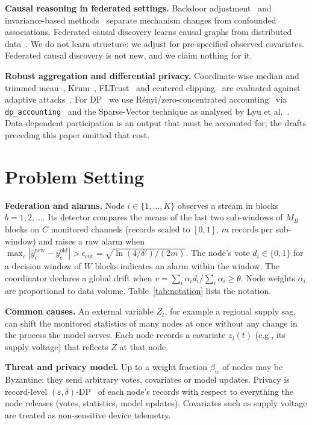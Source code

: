 \IfFileExists{IEEEtran.cls}{\documentclass[journal]{IEEEtran}\newcommand{\ieeemode}{}}{\documentclass[10pt,twocolumn,letterpaper]{article}\usepackage[margin=0.72in,columnsep=0.22in]{geometry}}
\begin{document}
\noindent\textbf{Causal reasoning in federated settings.} Backdoor adjustment~\cite{pearl2009causality} and invariance-based methods~\cite{peters2016icp} separate mechanism changes from confounded associations. Federated causal discovery learns causal graphs from distributed data~\cite{ng2022federatedbn,gao2023feddag,li2024fcd}. We do not learn structure: we adjust for pre-specified observed covariates. Federated causal discovery is not new, and we claim nothing for it.

\noindent\textbf{Robust aggregation and differential privacy.} Coordinate-wise median and trimmed mean~\cite{yin2018byzantine}, Krum~\cite{blanchard2017krum}, FLTrust~\cite{cao2021fltrust} and centered clipping~\cite{karimireddy2021cclip} are evaluated against adaptive attacks~\cite{baruch2019alie,xie2020ipm,shejwalkar2021minmax}. For DP~\cite{dwork2006calibrating,dwork2014algorithmic} we use Rényi/zero-concentrated accounting~\cite{mironov2017renyi,bun2016zcdp} via \texttt{dp\_accounting}~\cite{dpaccounting} and the Sparse-Vector technique as analysed by Lyu et al.~\cite{lyu2017svt}. Data-dependent participation is an output that must be accounted for; the drafts preceding this paper omitted that cost.

\section{Problem Setting}\label{sec:setting}
\noindent\textbf{Federation and alarms.} Node $i\in\{1,\dots,K\}$ observes a stream in blocks $b=1,2,\dots$. Its detector compares the means of the last two sub-windows of $M_B$ blocks on $C$ monitored channels (records scaled to $[0,1]$, $m$ records per sub-window) and raises a raw alarm when $\max_c|\bar y^{\text{new}}_c-\bar y^{\text{old}}_c|>\epsilon_{\text{cut}}=\sqrt{\ln(4/\delta')/(2m)}$. The node's vote $d_i\in\{0,1\}$ for a decision window of $W$ blocks indicates an alarm within the window. The coordinator declares a global drift when $v=\sum_i\alpha_i d_i/\sum_i\alpha_i\ge\theta$. Node weights $\alpha_i$ are proportional to data volume. Table~\ref{tab:notation} lists the notation.

\noindent\textbf{Common causes.} An external variable $Z_t$, for example a regional supply sag, can shift the monitored statistics of many nodes at once without any change in the process the model serves. Each node records a covariate $z_i(t)$ (e.g., its supply voltage) that reflects $Z$ at that node.

\noindent\textbf{Threat and privacy model.} Up to a weight fraction $\beta_w$ of nodes may be Byzantine: they send arbitrary votes, covariates or model updates. Privacy is record-level $(\varepsilon,\delta)$-DP~\cite{dwork2006calibrating} of each node's records with respect to everything the node releases (votes, statistics, model updates). Covariates such as supply voltage are treated as non-sensitive device telemetry.
\end{document}
